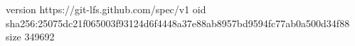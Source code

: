 version https://git-lfs.github.com/spec/v1
oid sha256:25075dc21f065003f93124d6f4448a37e88ab8957bd9594fc77ab0a500d34f88
size 349692
